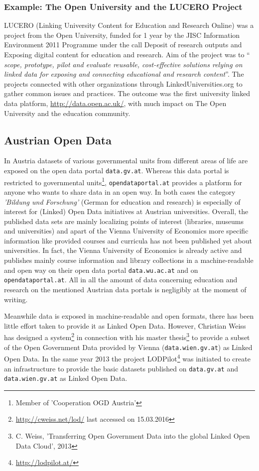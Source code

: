 \documentclass{article}
\begin{document}
\subsubsection{Example: The Open University and the LUCERO Project}
LUCERO (Linking University Content for Education and Research Online) was a project from the Open University, funded for 1 year by the JISC Information Environment 2011 Programme under the call Deposit of research outputs and Exposing digital content for education and research. Aim of the project was to "` \textit{ scope, prototype, pilot and evaluate reusable, cost-effective solutions relying on linked data for exposing and connecting educational and research content}"'.\cite{daquin_lucero_2010} The projects connected with other organizations through LinkedUniversities.org to gather common issues and practices. The outcome was the first university linked data platform, \url{http://data.open.ac.uk/}, with much impact on The Open University and the education community.

\subsection{Austrian Open Data}
\label{related-work:austrian-open-data}
In Austria datasets of various governmental units from different areas of life are exposed on the open data portal \texttt{data.gv.at}. Whereas this data portal is restricted to governmental units\footnote{Member of 'Cooperation OGD Austria'}, \texttt{opendataportal.at} provides a platform for anyone who wants to share data in an open way. In both cases the category \textit{'Bildung und Forschung'} (German for education and research) is especially of interest for (Linked) Open Data initiatives at Austrian universities. Overall, the published data sets are mainly localizing points of interest (libraries, museums and universities) and apart of the Vienna University of Economics more specific information like provided courses and curricula has not been published yet about universities. In fact, the Vienna University of Economics is already active and publishes mainly course information and library collections in a machine-readable and open way on their open data portal \texttt{data.wu.ac.at} and on \texttt{opendataportal.at}. All in all the amount of data concerning education and research on the mentioned Austrian data portals is negligibly at the moment of writing.

Meanwhile data is exposed in machine-readable and open formats, there has been little effort taken to provide it as Linked Open Data. However, Christian Weiss has designed a system\footnote{\url{http://cweiss.net/lod/} last accessed on 15.03.2016} in connection with his master thesis\footnote{C. Weiss, 'Transferring Open Government Data into the global Linked Open Data Cloud', 2013} to provide a subset of the Open Government Data provided by Vienna (\texttt{data.wien.gv.at}) as Linked Open Data. In the same year 2013 the project LODPilot\footnote{\url{http://lodpilot.at/}} was initiated to create an infrastructure to provide the basic datasets published on \texttt{data.gv.at} and \texttt{data.wien.gv.at} as Linked Open Data.
\end{document}
